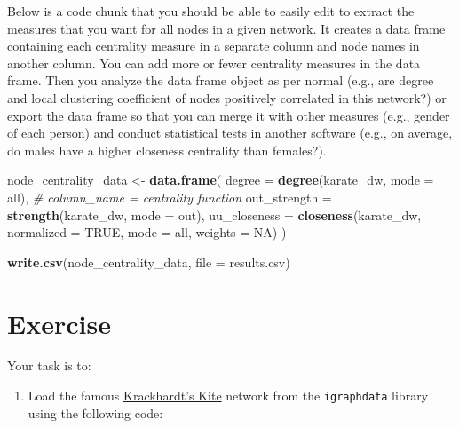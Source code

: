 \documentclass[
]{book}
\newenvironment{Shaded}{\begin{snugshade}}{\end{snugshade}}
\newcommand{\AttributeTok}[1]{\textcolor[rgb]{0.13,0.29,0.53}{#1}}
\newcommand{\CommentTok}[1]{\textcolor[rgb]{0.56,0.35,0.01}{\textit{#1}}}
\newcommand{\ConstantTok}[1]{\textcolor[rgb]{0.56,0.35,0.01}{#1}}
\newcommand{\FunctionTok}[1]{\textcolor[rgb]{0.13,0.29,0.53}{\textbf{#1}}}
\newcommand{\NormalTok}[1]{#1}
\newcommand{\OtherTok}[1]{\textcolor[rgb]{0.56,0.35,0.01}{#1}}
\newcommand{\StringTok}[1]{\textcolor[rgb]{0.31,0.60,0.02}{#1}}
\providecommand{\tightlist}{%
  \setlength{\itemsep}{0pt}\setlength{\parskip}{0pt}}
\begin{document}
Below is a code chunk that you should be able to easily edit to extract the measures that you want for all nodes in a given network. It creates a data frame containing each centrality measure in a separate column and node names in another column. You can add more or fewer centrality measures in the data frame. Then you analyze the data frame object as per normal (e.g., are degree and local clustering coefficient of nodes positively correlated in this network?) or export the data frame so that you can merge it with other measures (e.g., gender of each person) and conduct statistical tests in another software (e.g., on average, do males have a higher closeness centrality than females?).

\begin{Shaded}
\begin{Highlighting}[]
\NormalTok{node\_centrality\_data }\OtherTok{\textless{}{-}} \FunctionTok{data.frame}\NormalTok{(}
    \AttributeTok{degree =} \FunctionTok{degree}\NormalTok{(karate\_dw, }\AttributeTok{mode =} \StringTok{\textquotesingle{}all\textquotesingle{}}\NormalTok{), }\CommentTok{\# column\_name = centrality function }
    \AttributeTok{out\_strength =} \FunctionTok{strength}\NormalTok{(karate\_dw, }\AttributeTok{mode =} \StringTok{\textquotesingle{}out\textquotesingle{}}\NormalTok{),}
    \AttributeTok{uu\_closeness =} \FunctionTok{closeness}\NormalTok{(karate\_dw, }\AttributeTok{normalized =} \ConstantTok{TRUE}\NormalTok{, }\AttributeTok{mode =} \StringTok{\textquotesingle{}all\textquotesingle{}}\NormalTok{, }\AttributeTok{weights =} \ConstantTok{NA}\NormalTok{)}
\NormalTok{    )}

\FunctionTok{write.csv}\NormalTok{(node\_centrality\_data, }\AttributeTok{file =} \StringTok{\textquotesingle{}results.csv\textquotesingle{}}\NormalTok{)}
\end{Highlighting}
\end{Shaded}

\section{Exercise}\label{exercise-5}

Your task is to:

\begin{enumerate}
\def\labelenumi{\arabic{enumi}.}
\tightlist
\item
  Load the famous \href{https://en.wikipedia.org/wiki/Krackhardt_kite_graph}{Krackhardt's Kite} network from the \texttt{igraphdata} library using the following code:
\end{enumerate}
\end{document}
